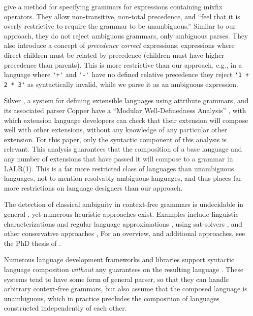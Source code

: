 \documentclass[acmsmall,review,anonymous]{acmart}\settopmatter{printfolios=true,printccs=false,printacmref=false}
\begin{document}
\citet{danielssonParsingMixfixOperators2011} give a method for specifying grammars for expressions containing mixfix operators. They allow non-transitive, non-total precedence, and ``feel that it is overly restrictive to require the grammar to be unambiguous.'' Similar to our approach, they do not reject ambiguous grammars, only ambiguous parses. They also introduce a concept of \emph{precedence correct} expressions; expressions where direct children must be related by precedence (children must have higher precedence than parents). This is more restrictive than our approach, e.g., in a language where \verb|'+'| and \verb|'-'| have no defined relative precedence they reject \verb|'1 + 2 * 3'| as syntactically invalid, while we parse it as an ambiguous expression.

Silver \cite{vanwykSilverExtensibleAttribute2010}, a system for defining extensible languages using attribute grammars, and its associated parser Copper \cite{} have a ``Modular Well-Definedness Analysis'' \cite{kaminskiModularWellDefinednessAnalysis2013}, with which extension language developers can check that their extension will compose well with other extensions, without any knowledge of any particular other extension. For this paper, only the syntactic component \cite{schwerdfegerVerifiableCompositionDeterministic2009} of this analysis is relevant. This analysis guarantees that the composition of a base language and any number of extensions that have passed it will compose to a grammar in LALR(1). This is a far more restricted class of languages than unambiguous languages, not to mention resolvably ambiguous languages, and thus places far more restrictions on language designers than our approach.

The detection of classical ambiguity in context-free grammars is undecidable in general \cite{cantorAmbiguityProblemBackus1962}, yet numerous heuristic approaches exist. Examples include linguistic characterizations and regular language approximations \cite{brabrandAnalyzingAmbiguityContextFree2007}, using sat-solvers \cite{axelssonAnalyzingContextFreeGrammars2008}, and other conservative approaches \cite{schmitzConservativeAmbiguityDetection2007}, For an overview, and additional approaches, see the PhD thesis of \citet{bastenAmbiguityDetectionProgramming2011}.

Numerous language development frameworks and libraries support syntactic language composition \emph{without} any guarantees on the resulting language \cite{heeringSyntaxDefinitionFormalism1989}. These systems tend to have some form of general parser, so that they can handle arbitrary context-free grammars, but also assume that the composed language is unambiguous, which in practice precludes the composition of languages constructed independently of each other.
\end{document}
